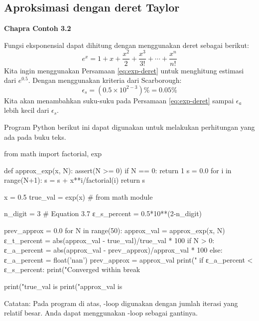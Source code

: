 \subsection{Aproksimasi dengan deret Taylor}

\textbf{Chapra Contoh 3.2}

Fungsi eksponensial dapat dihitung dengan menggunakan deret sebagai berikut:
\begin{equation}
e^{x} = 1 + x + \frac{x^2}{2} + \frac{x^3}{3!} + \cdots + \frac{x^n}{n!}
\label{eq:exp-deret}
\end{equation}
Kita ingin menggunakan Persamaan \eqref{eq:exp-deret} untuk menghitung estimasi
dari $e^{0.5}$.
Dengan menggunakan kriteria dari Scarborough:
\begin{equation*}
\epsilon_{s} = (0.5 \times 10^{2-3}) \% = 0.05 \%
\end{equation*}
Kita akan menambahkan suku-suku pada Persamaan \eqref{eq:exp-deret} sampai $\epsilon_{a}$
lebih kecil dari $\epsilon_{s}$.

Program Python berikut ini dapat digunakan untuk melakukan perhitungan yang ada pada buku teks.
\begin{pythoncode}
from math import factorial, exp

def approx_exp(x, N):
    assert(N >= 0)
    if N == 0:
        return 1
    s = 0.0
    for i in range(N+1):
        s = s + x**i/factorial(i)
    return s
  
x = 0.5
true_val = exp(x) # from math module
  
n_digit = 3
# Equation 3.7
ε_s_percent = 0.5*10**(2-n_digit)
  
prev_approx = 0.0
for N in range(50):
    approx_val = approx_exp(x, N)
    ε_t_percent = abs(approx_val - true_val)/true_val * 100
    if N > 0:
        ε_a_percent = abs(approx_val - prev_approx)/approx_val * 100
    else:
        ε_a_percent = float('nan')
    prev_approx = approx_val
    print("%
    if ε_a_percent < ε_s_percent:
        print("Converged within %
        break

print("true_val   is %
print("approx_val is %
\end{pythoncode}

Catatan: Pada program di atas, -loop digunakan dengan jumlah iterasi yang relatif
besar. Anda dapat menggunakan -loop sebagai gantinya.

